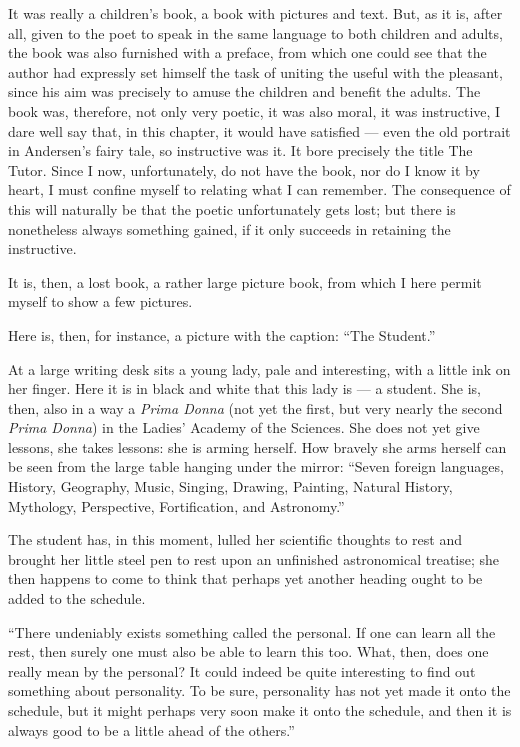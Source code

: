 \documentclass[12pt,a4paper]{book}
\begin{document}
It was really a children's book, a book with pictures and text. But, as it is, after all, given to the poet to speak in the same language to both children and adults, the book was also furnished with a preface, from which one could see that the author had expressly set himself the task of uniting the useful with the pleasant, since his aim was precisely to amuse the children and benefit the adults. The book was, therefore, not only very poetic, it was also moral, it was instructive, I dare well say that, in this chapter, it would have satisfied --- even the old portrait in Andersen's fairy tale, so instructive was it. It bore precisely the title The Tutor.
Since I now, unfortunately, do not have the book, nor do I know it by heart, I must confine myself to relating what I can remember. The consequence of this will naturally be that the poetic unfortunately gets lost; but there is nonetheless always something gained, if it only succeeds in retaining the instructive.

It is, then, a lost book, a rather large picture book, from which I here permit myself to show a few pictures.

Here is, then, for instance, a picture with the caption: ``The Student.''

At a large writing desk sits a young lady, pale and interesting, with a little ink on her finger. Here it is in black and white that this lady is --- a student. She is, then, also in a way a \textit{Prima Donna} (not yet the first, but very nearly the second \textit{Prima Donna}) in the Ladies' Academy of the Sciences. She does not yet give lessons, she takes lessons: she is arming herself. How bravely she arms herself can be seen from the large table hanging under the mirror: ``Seven foreign languages, History, Geography, Music, Singing, Drawing, Painting, Natural History, Mythology, Perspective, Fortification, and Astronomy.''

The student has, in this moment, lulled her scientific thoughts to rest and brought her little steel pen to rest upon an unfinished astronomical treatise; she then happens to come to think that perhaps yet another heading ought to be added to the schedule.

``There undeniably exists something called the personal. If one can learn all the rest, then surely one must also be able to learn this too. What, then, does one really mean by the personal? It could indeed be quite interesting to find out something about personality. To be sure, personality has not yet made it onto the schedule, but it might perhaps very soon make it onto the schedule, and then it is always good to be a little ahead of the others.''
\end{document}
